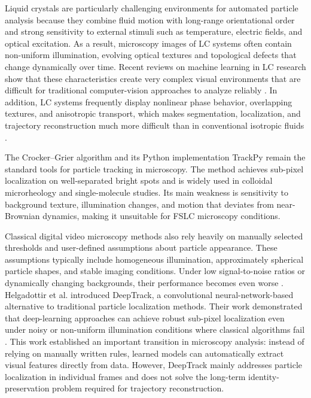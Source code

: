 \documentclass[conference]{IEEEtran}
\begin{document}
Liquid crystals are particularly challenging environments for automated particle analysis because they combine fluid motion with long-range orientational order and strong sensitivity to external stimuli such as temperature, electric fields, and optical excitation. As a result, microscopy images of LC systems often contain non-uniform illumination, evolving optical textures and topological defects that change dynamically over time. Recent reviews on machine learning in LC research show that these characteristics create very complex visual environments that are difficult for traditional computer-vision approaches to analyze reliably \cite{khan2025_ml_liquidcrystals}. In addition, LC systems frequently display nonlinear phase behavior, overlapping textures, and anisotropic transport, which makes segmentation, localization, and trajectory reconstruction much more difficult than in conventional isotropic fluids \cite{khan2025_ml_liquidcrystals}.

The Crocker–Grier algorithm \cite{crocker1996_digital_video_microscopy} and its Python implementation TrackPy \cite{allan2021_trackpy} remain the standard tools for particle tracking in microscopy. The method achieves sub-pixel localization on well-separated bright spots and is widely used in colloidal microrheology and single-molecule studies. Its main weakness is sensitivity to background texture, illumination changes, and motion that deviates from near-Brownian dynamics, making it unsuitable for FSLC microscopy conditions. 

Classical digital video microscopy methods also rely heavily on manually selected thresholds and user-defined assumptions about particle appearance. These assumptions typically include homogeneous illumination, approximately spherical particle shapes, and stable imaging conditions. Under low signal-to-noise ratios or dynamically changing backgrounds, their performance becomes even worse \cite{helgadottir2019digitalvideomicroscopy}. Helgadottir et al. introduced DeepTrack, a convolutional neural-network-based alternative to traditional particle localization methods. Their work demonstrated that deep-learning approaches can achieve robust sub-pixel localization even under noisy or non-uniform illumination conditions where classical algorithms fail \cite{helgadottir2019digitalvideomicroscopy}. This work established an important transition in microscopy analysis: instead of relying on manually written rules, learned models can automatically extract visual features directly from data. However, DeepTrack mainly addresses particle localization in individual frames and does not solve the long-term identity-preservation problem required for trajectory reconstruction.
\end{document}
